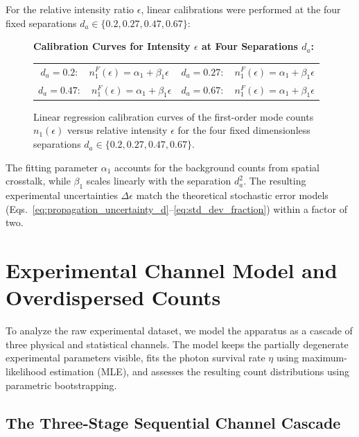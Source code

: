For the relative intensity ratio $\epsilon$, linear calibrations were performed at the four fixed separations $d_a \in \{0.2, 0.27, 0.47, 0.67\}$:

\begin{figure}[h!]
    \centering
    \begin{center}
        \textbf{Calibration Curves for Intensity $\epsilon$ at Four Separations $d_a$:} \\
        \begin{tabular}{cc}
            $d_a = 0.2: \quad n_1^F(\epsilon) = \alpha_1 + \beta_1 \epsilon$  & $d_a = 0.27: \quad n_1^F(\epsilon) = \alpha_1 + \beta_1 \epsilon$ \\
            $d_a = 0.47: \quad n_1^F(\epsilon) = \alpha_1 + \beta_1 \epsilon$ & $d_a = 0.67: \quad n_1^F(\epsilon) = \alpha_1 + \beta_1 \epsilon$
        \end{tabular}
    \end{center}
    \caption{Linear regression calibration curves of the first-order mode counts $n_1(\epsilon)$ versus relative intensity $\epsilon$ for the four fixed dimensionless separations $d_a \in \{0.2, 0.27, 0.47, 0.67\}$.}
    \label{fig:calibration_eps_link}
\end{figure}

The fitting parameter $\alpha_1$ accounts for the background counts from spatial crosstalk, while $\beta_1$ scales linearly with the separation $d_a^2$. The resulting experimental uncertainties $\Delta\epsilon$ match the theoretical stochastic error models (Eqs.~\eqref{eq:propagation_uncertainty_d}--\eqref{eq:std_dev_fraction}) within a factor of two.

\section{Experimental Channel Model and Overdispersed Counts}
\label{sec:practical_channel_framework}

To analyze the raw experimental dataset, we model the apparatus as a cascade of three physical and statistical channels. The model keeps the partially degenerate experimental parameters visible, fits the photon survival rate $\eta$ using maximum-likelihood estimation (MLE), and assesses the resulting count distributions using parametric bootstrapping.

\subsection{The Three-Stage Sequential Channel Cascade}

